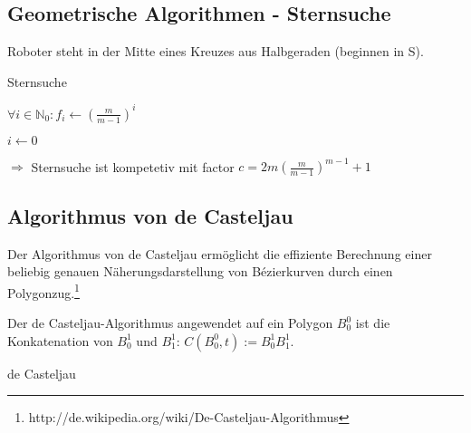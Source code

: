 \subsection{Geometrische Algorithmen - Sternsuche}

Roboter steht in der Mitte eines Kreuzes aus Halbgeraden (beginnen in S).\\

\begin{algorithm}[H]
	\caption{Sternsuche}
        
        $\forall i \in \mathbb{N}_0 : f_i \leftarrow \left(\frac{m}{m-1}\right)^i$

	$i \leftarrow 0$
	
\end{algorithm}

$\Rightarrow$ Sternsuche ist kompetetiv mit factor $c = 2m \left(\frac{m}{m-1}\right)^{m-1}+1$


\subsection{Algorithmus von de Casteljau}
Der Algorithmus von de Casteljau ermöglicht die effiziente Berechnung einer beliebig genauen Näherungsdarstellung von Bézierkurven durch einen Polygonzug.\footnote{http://de.wikipedia.org/wiki/De-Casteljau-Algorithmus}

Der de Casteljau-Algorithmus angewendet auf ein Polygon \(B_0^0\) ist die Konkatenation von \(B_0^1\) und \(B_1^1\): \(C(B_0^0,t) := B_0^1 B_1^1\).

\begin{algorithm}[H]
	\caption{de Casteljau}

	\BlankLine

\end{algorithm}


